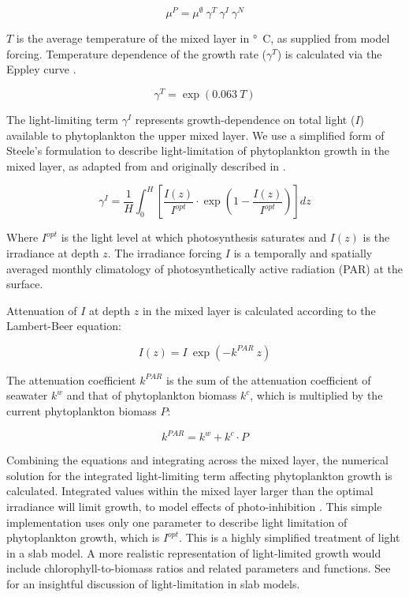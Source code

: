 \documentclass[template.tex]{subfiles}
\begin{document}
\begin{equation}
    \mu^{P} = \mu^{\emptyset} \ \gamma^{T} \ \gamma^{I} \ \gamma^{N}
\end{equation}

$T$ is the average temperature of the mixed layer in \unit{\degree C}, as supplied from model forcing. Temperature dependence of the growth rate ($\gamma^{T}$) is calculated via the Eppley curve \citep{Eppley1972TemperatureSea}.

\begin{equation}
    \gamma^{T} = \exp{(0.063 \ T)} \label{mumax}
\end{equation}

The light-limiting term $\gamma^{I}$ represents growth-dependence on total light ($I$) available to phytoplankton the upper mixed layer. We use a simplified form of Steele's formulation to describe light-limitation of phytoplankton growth in the mixed layer, as adapted from \citet{Acevedo-Trejos2016} and originally described in \citet{Steele1962EnvironmentalSea}.

\begin{equation}
    \gamma^{I} = \frac{1}{H} \int_{0}^{H}\left[ \frac{I(z)}{I^{opt}} \cdot \exp{\left( 1 - \frac{I(z)}{I^{opt}} \right) }  \right]dz \label{steele}
\end{equation}

Where $I^{opt}$ is the light level at which photosynthesis saturates and $I(z)$ is the irradiance at depth $z$.
The irradiance forcing $I$ is a temporally and spatially averaged monthly climatology of photosynthetically active radiation (PAR) at the surface. 

Attenuation of $I$ at depth $z$ in the mixed layer is calculated according to the Lambert-Beer equation:

\begin{equation}
    I(z) = I \ \exp{(-k^{PAR} \ z)} \label{beer}
\end{equation}

The attenuation coefficient $k^{PAR}$ is the sum of the attenuation coefficient of seawater $k^w$ and that of phytoplankton biomass $k^c$, which is multiplied by the current phytoplankton biomass $P$:

\begin{equation}
    k^{PAR} = k^w + k^c \cdot P
\end{equation}

Combining the equations and integrating across the mixed layer, the numerical solution for the integrated light-limiting term affecting phytoplankton growth is calculated. Integrated values within the mixed layer larger than the optimal irradiance will limit growth, to model effects of photo-inhibition \citep{Steele1962EnvironmentalSea}.
This simple implementation uses only one parameter to describe light limitation of phytoplankton growth, which is $I^{opt}$. This is a highly simplified treatment of light in a slab model. A more realistic representation of light-limited growth would include chlorophyll-to-biomass ratios and related parameters and functions. See \citet{Anderson2015c} for an insightful discussion of light-limitation in slab models.\\
\end{document}
